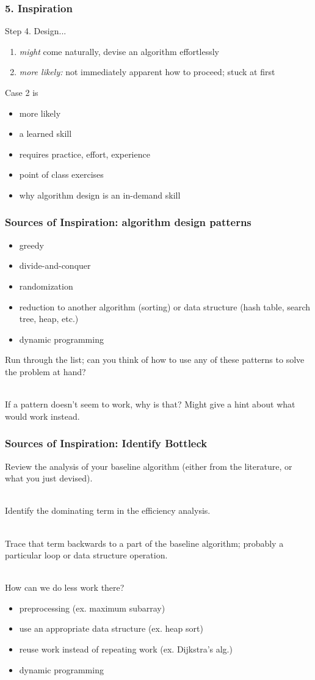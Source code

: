 \documentclass{beamer}
\newcommand{\stanza}{ \\~\ }
\begin{document}
\begin{frame} \frametitle{5. Inspiration}
Step 4. Design...
\begin{enumerate}
  \item \emph{might} come naturally, devise an algorithm effortlessly
  \item \emph{more likely:} not immediately apparent how to proceed; stuck
    at first
\end{enumerate}
\vspace{.5cm}
Case 2 is
\begin{itemize}
  \item more likely
  \item a learned skill
  \item requires practice, effort, experience
  \item point of class exercises
  \item why algorithm design is an in-demand skill
\end{itemize}
\end{frame}

\begin{frame} \frametitle{Sources of Inspiration: algorithm design patterns}
\begin{itemize}
  \item greedy
  \item divide-and-conquer
  \item randomization
  \item reduction to another algorithm (sorting) or data structure (hash table,
    search tree, heap, etc.)
  \item dynamic programming
\end{itemize}
\vspace{.5cm}
Run through the list; can you think of how to use any of these patterns to solve
the problem at hand? \stanza

If a pattern doesn't seem to work, why is that? Might give a hint about what
would work instead.
\end{frame}

\begin{frame} \frametitle{Sources of Inspiration: Identify Bottleck}
Review the analysis of your baseline algorithm (either from the literature,
or what you just devised). \stanza

Identify the dominating term in the efficiency analysis. \stanza

Trace that term backwards to a part of the baseline algorithm; probably a
particular loop or data structure operation. \stanza

How can we do less work there?
\begin{itemize}
  \item preprocessing (ex. maximum subarray)
  \item use an appropriate data structure (ex. heap sort)
  \item reuse work instead of repeating work (ex. Dijkstra's alg.)
  \item dynamic programming
\end{itemize}
\end{frame}
\end{document}
